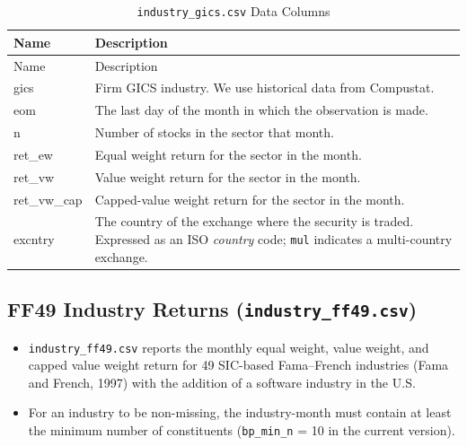 \documentclass[12pt,title,fleqn]{article}
\begin{document}
{\scriptsize
	\begin{longtable}{@{\extracolsep{\fill}}|l|m{14.2cm}|@{}}
	\caption{\texttt{industry\_gics.csv} Data Columns \label{industry_gics}}\\
	
	\hline
	Name & Description \\
	\hline
	\endfirsthead
	
	\hline
	Name & Description \\
	\hline
	\endhead
	
	\hline
	\endfoot
	
	
	\hline\hline
	\endlastfoot
	
	gics\rule{0pt}{10pt} &Firm GICS industry. We use historical data from Compustat. \\[1ex]
	
	eom & The last day of the month in which the observation is made. \\[1ex]

	n & Number of stocks in the sector that month. \\[1ex]

	ret\_ew & Equal weight return for the sector in the month.\\[1ex]

	ret\_vw & Value weight return for the sector in the month.\\[1ex]

	ret\_vw\_cap & Capped-value weight return for the sector in the month.\\[1ex]

	excntry & The country of the exchange where the security is traded. Expressed as an ISO \emph{country} code; \texttt{mul} indicates a multi\hyp country exchange. \\[1ex]

\end{longtable}}


\subsection{FF49 Industry Returns (\texttt{industry\_ff49.csv})}
\begin{itemize}
    \item \texttt{industry\_ff49.csv} reports the monthly equal weight, value weight, and capped value weight return for 49 SIC-based Fama–French industries (Fama and French, 1997) with the addition of a software industry in the U.S.
    \item For an industry to be non-missing, the industry-month must contain at least the minimum number of constituents (\texttt{bp\_min\_n} = 10 in the current version).

\end{itemize}
\end{document}
